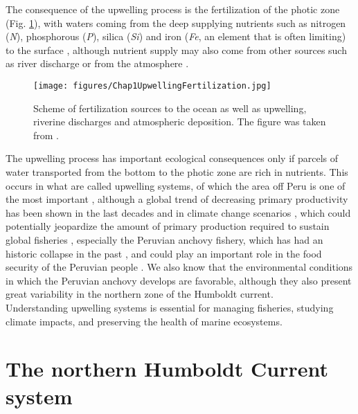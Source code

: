 The consequence of the upwelling process is the fertilization of the photic zone (Fig. \ref{Chap1UpwellingFertilization}), with waters coming from the deep supplying nutrients such as nitrogen (\textit{N}), phosphorous (\textit{P}), silica (\textit{Si}) and iron (\textit{Fe}, an element that is often limiting) to the surface \citep{GeidLaro1994,Behr1996,BehrKolb1999,Hutc2002,MoorMils2013,BrisMohr2017}, although nutrient supply may also come from other sources such as river discharge \citep{Shar2017} or from the atmosphere \citep{Powe2015}.\\

\begin{figure}[ht]
	\texttt{[image: figures/Chap1UpwellingFertilization.jpg]}
	\centering
	\caption{Scheme of fertilization sources to the ocean as well as upwelling, riverine discharges and atmospheric deposition. The figure was taken from \cite{BrisMohr2017}.}
	\centering
	\label{Chap1UpwellingFertilization}
\end{figure}

The upwelling process has important ecological consequences only if parcels of water transported from the bottom to the photic zone are rich in nutrients. This occurs in what are called upwelling systems, of which the area off Peru is one of the most important \citep{ChavBert2008}, although  a global trend of decreasing primary productivity has been shown in the last decades \citep{Dema2009,Roxy2016} and in climate change scenarios \citep{Blanc2012,Kulk2020}, which could potentially jeopardize the amount of primary production required to sustain global fisheries \citep{PaulChri1995}, especially the Peruvian anchovy fishery, which has had an historic collapse in the past \citep{AriaNiqu2011,Aria2012}, and could play an important role in the food security of the Peruvian people \citep{MajlDela2017}. We also know that the environmental conditions in which the Peruvian anchovy develops are favorable, although they also present great variability in the northern zone of the Humboldt current.\\

Understanding upwelling systems is essential for managing fisheries, studying climate impacts, and preserving the health of marine ecosystems.\\

\clearpage

\section{The northern Humboldt Current system}\label{Chap1NHCS}

